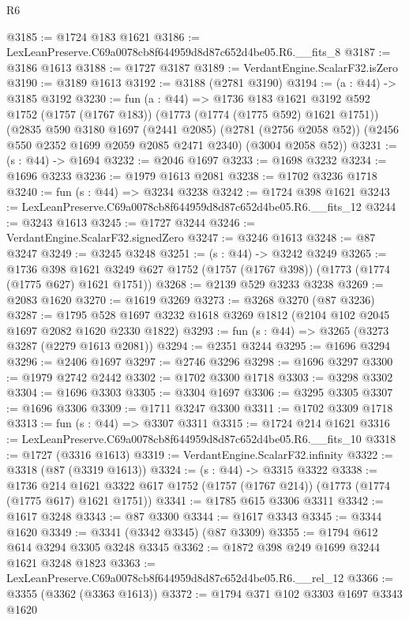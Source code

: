 \begin{lexlean}{R6}
\begin{coremodule}
@3185 := @1724 @183 @1621
@3186 := LexLeanPreserve.C69a0078cb8f644959d8d87c652d4be05.R6.__fits_8
@3187 := @3186 @1613
@3188 := @1727 @3187
@3189 := VerdantEngine.ScalarF32.isZero
@3190 := @3189 @1613
@3192 := @3188 (@2781 @3190)
@3194 := (a : @44) -> @3185 @3192
@3230 := fun (a : @44) =>
  @1736
    @183
    @1621
    @3192
    @592
    @1752
    (@1757 (@1767 @183))
    (@1773 (@1774 (@1775 @592) @1621 @1751))
    (@2835
      @590
      @3180
      @1697
      (@2441 @2085)
      (@2781 (@2756 @2058 @52))
      (@2456 @550 @2352 @1699 @2059 @2085 @2471 @2340)
      (@3004 @2058 @52))
@3231 := (s : @44) -> @1694
@3232 := @2046 @1697
@3233 := @1698 @3232
@3234 := @1696 @3233
@3236 := @1979 @1613 @2081
@3238 := @1702 @3236 @1718
@3240 := fun (s : @44) => @3234 @3238
@3242 := @1724 @398 @1621
@3243 := LexLeanPreserve.C69a0078cb8f644959d8d87c652d4be05.R6.__fits_12
@3244 := @3243 @1613
@3245 := @1727 @3244
@3246 := VerdantEngine.ScalarF32.signedZero
@3247 := @3246 @1613
@3248 := @87 @3247
@3249 := @3245 @3248
@3251 := (s : @44) -> @3242 @3249
@3265 := @1736
    @398
    @1621
    @3249
    @627
    @1752
    (@1757 (@1767 @398))
    (@1773 (@1774 (@1775 @627) @1621 @1751))
@3268 := @2139 @529 @3233 @3238
@3269 := @2083 @1620
@3270 := @1619 @3269
@3273 := @3268 @3270 (@87 @3236)
@3287 := @1795 @528 @1697 @3232 @1618 @3269 @1812 (@2104 @102 @2045 @1697 @2082 @1620 @2330 @1822)
@3293 := fun (s : @44) => @3265 (@3273 @3287 (@2279 @1613 @2081))
@3294 := @2351 @3244
@3295 := @1696 @3294
@3296 := @2406 @1697
@3297 := @2746 @3296
@3298 := @1696 @3297
@3300 := @1979 @2742 @2442
@3302 := @1702 @3300 @1718
@3303 := @3298 @3302
@3304 := @1696 @3303
@3305 := @3304 @1697
@3306 := @3295 @3305
@3307 := @1696 @3306
@3309 := @1711 @3247 @3300
@3311 := @1702 @3309 @1718
@3313 := fun (s : @44) => @3307 @3311
@3315 := @1724 @214 @1621
@3316 := LexLeanPreserve.C69a0078cb8f644959d8d87c652d4be05.R6.__fits_10
@3318 := @1727 (@3316 @1613)
@3319 := VerdantEngine.ScalarF32.infinity
@3322 := @3318 (@87 (@3319 @1613))
@3324 := (s : @44) -> @3315 @3322
@3338 := @1736
    @214
    @1621
    @3322
    @617
    @1752
    (@1757 (@1767 @214))
    (@1773 (@1774 (@1775 @617) @1621 @1751))
@3341 := @1785 @615 @3306 @3311
@3342 := @1617 @3248
@3343 := @87 @3300
@3344 := @1617 @3343
@3345 := @3344 @1620
@3349 := @3341 (@3342 @3345) (@87 @3309)
@3355 := @1794 @612 @614 @3294 @3305 @3248 @3345
@3362 := @1872 @398 @249 @1699 @3244 @1621 @3248 @1823
@3363 := LexLeanPreserve.C69a0078cb8f644959d8d87c652d4be05.R6.__rel_12
@3366 := @3355 (@3362 (@3363 @1613))
@3372 := @1794 @371 @102 @3303 @1697 @3343 @1620

\end{coremodule}
\end{lexlean}
